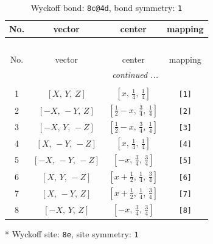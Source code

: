 \documentclass[fleqn,8pt]{jsarticle}
\begin{document}
\renewcommand{\arraystretch}{1.2}
\begin{longtable}{cccc}
\caption{Wyckoff bond: {\tt 8c@4d}, bond symmetry: {\tt 1}}
 \\
 \hline \hline
No. & vector & center & mapping \\ \hline \endfirsthead

\multicolumn{3}{l}{\tablename\ \thetable{}} \\
 \hline \hline
No. & vector & center & mapping \\ \hline \endhead

 \hline \hline
\multicolumn{3}{r}{\footnotesize\it continued ...} \\ \endfoot

 \hline \hline
\multicolumn{3}{r}{} \\ \endlastfoot

1 & $\left[ X,\, Y,\, Z \right]$ & $\left[ x,\, \frac{1}{4},\, \frac{1}{4} \right]$ & {\tt [1]} \\ \hline
2 & $\left[ - X,\, - Y,\, Z \right]$ & $\left[ \frac{1}{2} - x,\, \frac{3}{4},\, \frac{1}{4} \right]$ & {\tt [2]} \\ \hline
3 & $\left[ - X,\, Y,\, - Z \right]$ & $\left[ \frac{1}{2} - x,\, \frac{3}{4},\, \frac{1}{4} \right]$ & {\tt [3]} \\ \hline
4 & $\left[ X,\, - Y,\, - Z \right]$ & $\left[ x,\, \frac{1}{4},\, \frac{1}{4} \right]$ & {\tt [4]} \\ \hline
5 & $\left[ - X,\, - Y,\, - Z \right]$ & $\left[ - x,\, \frac{3}{4},\, \frac{3}{4} \right]$ & {\tt [5]} \\ \hline
6 & $\left[ X,\, Y,\, - Z \right]$ & $\left[ x + \frac{1}{2},\, \frac{1}{4},\, \frac{3}{4} \right]$ & {\tt [6]} \\ \hline
7 & $\left[ X,\, - Y,\, Z \right]$ & $\left[ x + \frac{1}{2},\, \frac{1}{4},\, \frac{3}{4} \right]$ & {\tt [7]} \\ \hline
8 & $\left[ - X,\, Y,\, Z \right]$ & $\left[ - x,\, \frac{3}{4},\, \frac{3}{4} \right]$ & {\tt [8]} \\
\end{longtable}
* Wyckoff site: {\tt 8e}, site symmetry: {\tt 1}
\renewcommand{\arraystretch}{1.2}
\end{document}
